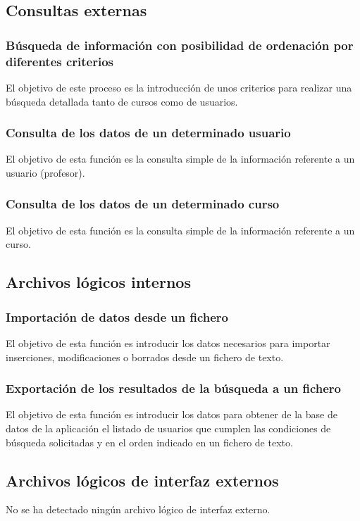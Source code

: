 \documentclass[11pt,a4paper,spanish,twoside]{book}
\begin{document}
\subsection{Consultas externas}
\subsubsection{Búsqueda de información con posibilidad de ordenación por
  diferentes criterios}
El objetivo de este proceso es la introducción de unos criterios para realizar 
una búsqueda detallada tanto de cursos como de usuarios.

\subsubsection{Consulta de los datos de un determinado usuario}
El objetivo de esta función es la consulta simple de la información referente
a un usuario (profesor).

\subsubsection{Consulta de los datos de un determinado curso}
El objetivo de esta función es la consulta simple de la información referente
a un curso.

\subsection{Archivos lógicos internos}
\subsubsection{Importación de datos desde un fichero}
El objetivo de esta función es introducir los datos necesarios para importar 
inserciones, modificaciones o borrados desde un fichero de texto.

\subsubsection{Exportación de los resultados de la búsqueda a un fichero}
El objetivo de esta función es introducir los datos para obtener de la base
de datos de la aplicación el listado de usuarios que cumplen las condiciones de
búsqueda solicitadas y en el orden indicado en un fichero de texto.

\subsection{Archivos lógicos de interfaz externos}
No se ha detectado ningún archivo lógico de interfaz externo.
\end{document}
